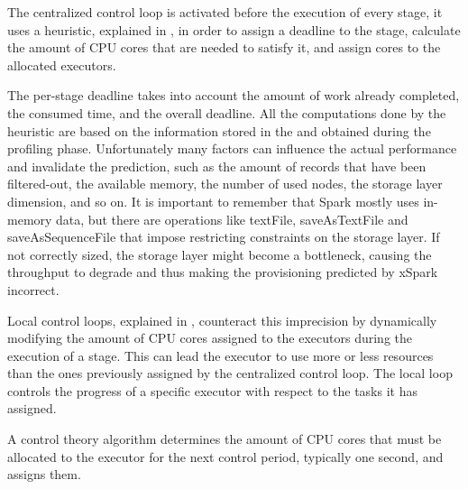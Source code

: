 The centralized control loop is activated before the execution of every stage, it uses a heuristic, explained in , in order to assign a deadline to the stage, calculate the amount of CPU cores that are needed to satisfy it, and assign cores to the allocated executors. 

The per-stage deadline takes into account the amount of work already completed, the consumed time, and the overall deadline. All the computations done by the heuristic are based on the information stored in the \plan and obtained during the profiling phase. Unfortunately
many factors can influence the actual performance and invalidate the prediction, such as the amount of records that have been filtered-out, the available memory, the number of used nodes,
the storage layer dimension, and so on. It is important to remember that Spark mostly uses in-memory data, but there are operations like textFile, saveAsTextFile and saveAsSequenceFile that impose restricting constraints on the storage layer. If not correctly sized,
the storage layer might become a bottleneck, causing the throughput to degrade and thus making the provisioning predicted by xSpark incorrect.

Local control loops, explained in , counteract this imprecision
by dynamically modifying the amount of CPU cores assigned to the executors during the execution of a stage. This can lead the executor to use more or less resources than the ones previously
assigned by the centralized control loop. The local loop controls the progress of a specific executor with respect to the tasks it has assigned.

A control theory algorithm determines the amount of CPU cores that must be allocated to the executor for the next control period, typically one second, and assigns them.

